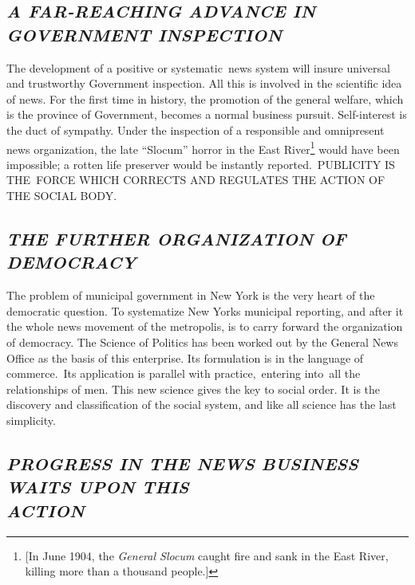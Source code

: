 \documentclass[openany,nobib]{tufte-book}
\begin{document}
\hypertarget{a-far-reaching-advance-in-government-inspection}{%
\subsection{\emph{A FAR-REACHING ADVANCE IN GOVERNMENT
INSPECTION}}\label{a-far-reaching-advance-in-government-inspection}}

The development of a positive or systematic~news system will insure
universal and trustworthy Government inspection. All this is involved in
the scientific idea of news. For the first time in history, the
promotion of the general welfare, which is the province of Government,
becomes a normal business pursuit. Self-interest is the duct of
sympathy. Under the inspection of a responsible and omnipresent news
organization, the late ``Slocum'' horror in the East River\footnote{{[}In
  June 1904, the \emph{General Slocum} caught fire and sank in the East
  River, killing more than a thousand people.{]}} would have been
impossible; a rotten life preserver would be instantly
reported.~PUBLICITY IS THE~FORCE WHICH CORRECTS AND REGULATES THE ACTION
OF THE SOCIAL BODY.~

\hypertarget{the-further-organization-of-democracy}{%
\subsection{\emph{THE FURTHER ORGANIZATION OF
DEMOCRACY}}\label{the-further-organization-of-democracy}}

The problem of municipal government in New York is the very heart of the
democratic question. To systematize New York\textquotesingle s municipal
reporting, and after it the whole news movement of the metropolis, is to
carry forward the organization of democracy. The Science of Politics has
been worked out by the General News Office as the basis of this
enterprise. Its formulation is in the language of commerce.~Its
application is parallel with practice,~entering into~all the
relationships of men. This new science gives the key to social order. It
is the discovery and classification of the social system, and like all
science has the last simplicity.~

\hypertarget{progress-in-the-news-business-waits-upon-this-action}{%
\subsection{\emph{PROGRESS IN THE NEWS BUSINESS WAITS UPON THIS\\\noindent ACTION}}\label{progress-in-the-news-business-waits-upon-this-action}}
\end{document}
